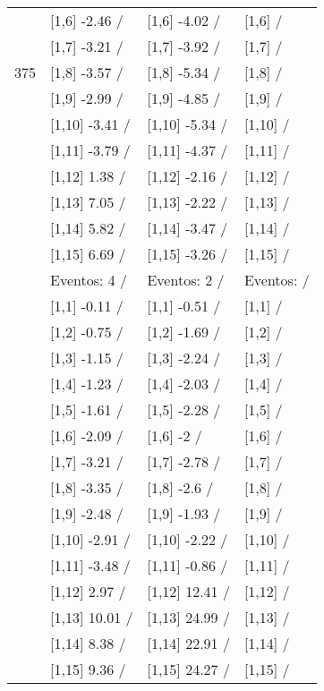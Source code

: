 \begin{table}
\begin{tabular}[t]{llll}
 & {}[1,6] -2.46  / & {}[1,6] -4.02  / & {}[1,6]  /\\
 & {}[1,7] -3.21  / & {}[1,7] -3.92  / & {}[1,7]  /\\
375 & {}[1,8] -3.57  / & {}[1,8] -5.34  / & {}[1,8]  /\\
\addlinespace
 & {}[1,9] -2.99  / & {}[1,9] -4.85  / & {}[1,9]  /\\
 & {}[1,10] -3.41  / & {}[1,10] -5.34  / & {}[1,10]  /\\
 & {}[1,11] -3.79  / & {}[1,11] -4.37  / & {}[1,11]  /\\
 & {}[1,12] 1.38  / & {}[1,12] -2.16  / & {}[1,12]  /\\
 & {}[1,13] 7.05  / & {}[1,13] -2.22  / & {}[1,13]  /\\
\addlinespace
 & {}[1,14] 5.82  / & {}[1,14] -3.47  / & {}[1,14]  /\\
 & {}[1,15] 6.69  / & {}[1,15] -3.26  / & {}[1,15]  /\\
 & Eventos:  4 / & Eventos:  2 / & Eventos:   /\\
 & {}[1,1] -0.11  / & {}[1,1] -0.51  / & {}[1,1]  /\\
 & {}[1,2] -0.75  / & {}[1,2] -1.69  / & {}[1,2]  /\\
\addlinespace
 & {}[1,3] -1.15  / & {}[1,3] -2.24  / & {}[1,3]  /\\
 & {}[1,4] -1.23  / & {}[1,4] -2.03  / & {}[1,4]  /\\
 & {}[1,5] -1.61  / & {}[1,5] -2.28  / & {}[1,5]  /\\
 & {}[1,6] -2.09  / & {}[1,6] -2  / & {}[1,6]  /\\
 & {}[1,7] -3.21  / & {}[1,7] -2.78  / & {}[1,7]  /\\
\addlinespace
500 & {}[1,8] -3.35  / & {}[1,8] -2.6  / & {}[1,8]  /\\
 & {}[1,9] -2.48  / & {}[1,9] -1.93  / & {}[1,9]  /\\
 & {}[1,10] -2.91  / & {}[1,10] -2.22  / & {}[1,10]  /\\
 & {}[1,11] -3.48  / & {}[1,11] -0.86  / & {}[1,11]  /\\
 & {}[1,12] 2.97  / & {}[1,12] 12.41  / & {}[1,12]  /\\
\addlinespace
 & {}[1,13] 10.01  / & {}[1,13] 24.99  / & {}[1,13]  /\\
 & {}[1,14] 8.38  / & {}[1,14] 22.91  / & {}[1,14]  /\\
 & {}[1,15] 9.36  / & {}[1,15] 24.27  / & {}[1,15]  /\\
\bottomrule
\end{tabular}
\end{table}
